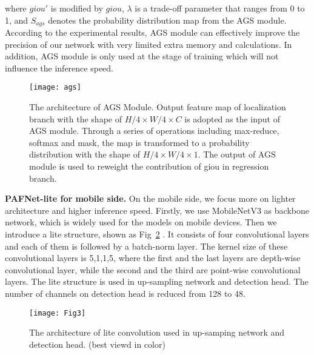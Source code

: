 \documentclass[10pt,twocolumn,letterpaper]{article}
\begin{document}
    where ${giou'}$ is modified by $giou$, $\lambda$ is a trade-off parameter that ranges from 0 to 1, and $S_{ags}$ denotes the probability distribution map from the AGS module. According to the experimental results, AGS module can effectively improve the precision of our network with very limited extra memory and calculations. In addition, AGS module is only used at the stage of training which will not influence the inference speed.
    
    \begin{figure}[h]
\begin{center}
            \centerline{\texttt{[image: ags]}}
            \caption{The architecture of AGS Module. Output feature map of localization branch with the shape of ${H/4 \times W/4 \times C}$ is adopted as the input of AGS module. Through a series of operations including max-reduce, softmax and mask, the map is transformed to a probability distribution with the shape of ${H/4 \times W/4 \times 1}$. The output of AGS module is used to reweight the contribution of giou in regression branch.}
            \label{fig:ags} 
        \end{center}
\end{figure}

    \textbf{PAFNet-lite for mobile side.} On the mobile side, we focus more on lighter architecture and higher inference speed. Firstly, we use MobileNetV3 as backbone network, which is widely used for the models on mobile devices. Then we introduce a lite  structure, shown as Fig~\ref{Fig3} . It consists of four convolutional layers and each of them is followed by a batch-norm layer. The kernel size of these convolutional layers is 5,1,1,5, where the first and the last layers are depth-wise convolutional layer, while the second and the third are point-wise convolutional layers. The lite structure is used in up-sampling network and detection head. The number of channels on detection head is reduced from 128 to 48.
    
    \begin{figure}[h]
\begin{center}
			\centerline{\texttt{[image: Fig3]}}
			\caption{The architecture of lite convolution used in up-samping network and detection head. (best viewd in color)}
			\label{Fig3}
		\end{center}
\end{figure}
    
    
    
\end{document}
